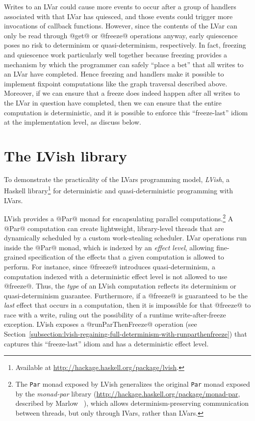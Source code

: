 Writes to an LVar could cause more events to occur after a group of handlers associated
with that LVar has quiesced, and those events could trigger more
invocations of callback functions.  However, since the contents of the
LVar can only be read through @get@ or @freeze@
operations anyway, early quiescence poses no risk to determinism or
quasi-determinism, respectively.  In fact, freezing and quiescence
work particularly well together because freezing provides a mechanism
by which the programmer can safely ``place a bet'' that all writes to an LVar
have completed.  Hence freezing and handlers make it possible to implement fixpoint
computations like the graph traversal described above.  Moreover, if
we can ensure that a freeze does indeed happen after all writes to the LVar in question have
completed, then we can ensure that the entire computation is deterministic,
and it is possible to enforce this ``freeze-last'' idiom at the
implementation level, as  discuss below.

\section{The LVish library}\label{s:intro-lvish}

To demonstrate the practicality of the LVars programming model, 
\emph{LVish}, a Haskell library\footnote{Available at
  \url{http://hackage.haskell.org/package/lvish}.}
for deterministic and quasi-deterministic programming with LVars.

LVish provides a @Par@ monad for encapsulating parallel computations.\footnote{The
  \lstinline|Par| monad exposed by LVish generalizes the original
  \lstinline|Par| monad exposed by the \emph{monad-par} library
  ({\url{http://hackage.haskell.org/package/monad-par}}, described by
  Marlow \etal~\cite{monad-par}), which allows determinism-preserving
  communication between threads, but only through IVars, rather than
  LVars.}
A @Par@ computation can create lightweight, library-level threads that
are dynamically scheduled by a custom work-stealing scheduler.
LVar operations run inside the @Par@ monad, which is
indexed by an \emph{effect level}, allowing fine-grained specification
of the effects that a given computation is allowed to perform.  For
instance, since @freeze@ introduces quasi-determinism, a computation
indexed with a deterministic effect level is not allowed to use
@freeze@.  Thus, the \emph{type} of an LVish computation reflects its
determinism or quasi-determinism guarantee.  Furthermore, if a
@freeze@ is guaranteed to be the \emph{last} effect that occurs in a
computation, then it is impossible for that @freeze@ to race with a
write, ruling out the possibility of a runtime write-after-freeze
exception.  LVish exposes a @runParThenFreeze@ operation 
(see Section~\ref{subsection:lvish-regaining-full-determinism-with-runparthenfreeze})
that captures
this ``freeze-last'' idiom and has a deterministic effect level.

